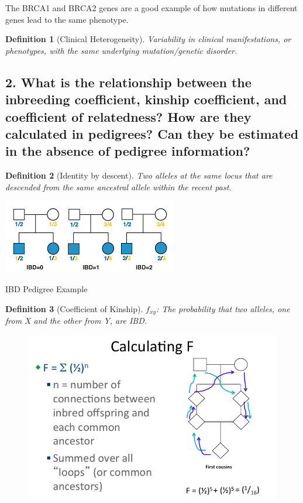 \documentclass{tufte-handout}
\newtheorem*{define}{Definition}
\begin{document}
The BRCA1 and BRCA2 genes are a good example of how mutations in different genes lead to the same phenotype. 

\begin{define}[Clinical Heterogeneity]
Variability in clinical manifestations, or phenotypes, with the same underlying mutation/genetic disorder.
\end{define}

\newpage
\subsection{2.
What is the relationship between the inbreeding coefficient, kinship coefficient, and coefficient of relatedness? How are they calculated in pedigrees? Can they be estimated in the absence of pedigree information?}
\label{subsec:02} 

\begin{define}[Identity by descent]
Two alleles at the same locus that are descended from the same ancestral allele within the recent past.
\end{define}

\begin{marginfigure}%
  \includegraphics[scale=0.65]{./figs/ibd}
  \caption{IBD Pedigree Example}
  \label{fig:marginfig}
\end{marginfigure}

\begin{define}[Coefficient of Kinship]
$f_{xy}$: The probability that two alleles, one from X and the other from Y, are IBD.
\end{define}

\begin{figure}
\includegraphics[scale=0.4]{./figs/kincoeff}
\end{figure}
\end{document}
